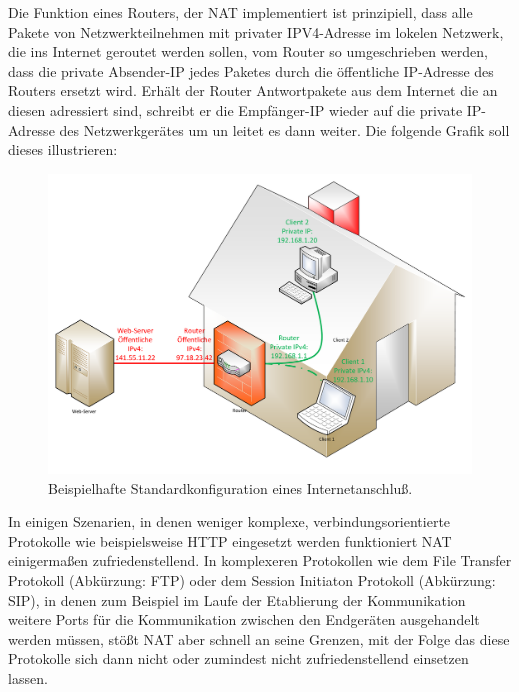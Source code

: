 \documentclass[a4paper,12pt]{scrartcl}
\begin{document}
Die Funktion eines Routers, der NAT implementiert ist prinzipiell, dass alle Pakete von Netzwerkteilnehmen mit privater IPV4-Adresse im lokelen Netzwerk, die ins Internet geroutet werden sollen, vom Router so umgeschrieben werden, dass die private Absender-IP jedes Paketes durch die \"offentliche IP-Adresse des Routers ersetzt wird. Erh\"alt der Router Antwortpakete aus dem Internet die an diesen adressiert sind, schreibt er die Empf\"anger-IP wieder auf die private IP-Adresse des Netzwerkger\"ates um un leitet es dann weiter. Die folgende Grafik soll dieses illustrieren:

\begin{figure}[htb]
\begin{center}
 \includegraphics[width=1\hsize]{./Zeichnungen/IPv4NAT.pdf}
 \end{center}
\caption[Beispielhafte Standardkonfiguration eines Internetanschlu\ss{} mit NAT, Quelle: Autor, verwendete Symbole unterliegen der
GPL]{\label{stdinet}Beispielhafte Standardkonfiguration eines Internetanschlu\ss{}.}
\end{figure}

In einigen Szenarien, in denen weniger komplexe, verbindungsorientierte Protokolle wie beispielsweise HTTP eingesetzt werden funktioniert NAT einigerma\ss{}en zufriedenstellend. In komplexeren Protokollen wie dem File Transfer Protokoll (Abk\"urzung: FTP) oder dem Session Initiaton Protokoll (Abk\"urzung: SIP), in denen zum Beispiel im Laufe der Etablierung der Kommunikation weitere Ports f\"ur die Kommunikation zwischen den Endger\"aten ausgehandelt werden m\"ussen, st\"o{\ss}t NAT aber schnell an seine Grenzen, mit der Folge das diese Protokolle sich dann nicht oder zumindest nicht zufriedenstellend einsetzen lassen.
\end{document}
